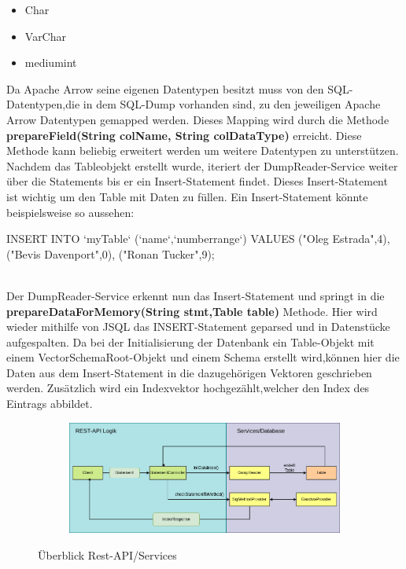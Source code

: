 \begin{itemize}
 \item Char
 \item VarChar
 \item mediumint
\end{itemize}

Da Apache Arrow seine eigenen Datentypen besitzt muss von den SQL-Datentypen,die in dem SQL-Dump vorhanden sind, zu den jeweiligen Apache Arrow Datentypen gemapped werden. 
Dieses Mapping wird durch die Methode \textbf{prepareField(String colName, String colDataType)} erreicht.
Diese Methode kann beliebig erweitert werden um weitere Datentypen zu unterstützen.\\
Nachdem das Tableobjekt erstellt wurde, iteriert der DumpReader-Service weiter über die Statements bis er ein Insert-Statement findet. Dieses Insert-Statement ist wichtig um den Table mit Daten zu füllen.
Ein Insert-Statement könnte beispielsweise so aussehen:\\

\begin{terminalblock}
  \begin{textcode}
INSERT INTO `myTable` (`name`,`numberrange`)
VALUES
  ("Oleg Estrada",4),
  ("Bevis Davenport",0),
  ("Ronan Tucker",9);
  \end{textcode}
\end{terminalblock}\\

Der DumpReader-Service erkennt nun das Insert-Statement und springt in die \textbf{prepareDataForMemory(String stmt,Table table)} Methode. Hier wird wieder mithilfe von JSQL das INSERT-Statement geparsed und in Datenstücke aufgespalten.
Da bei der Initialisierung der Datenbank ein Table-Objekt mit einem VectorSchemaRoot-Objekt und einem Schema erstellt wird,können hier die Daten aus dem Insert-Statement in die dazugehörigen Vektoren geschrieben werden.
Zusätzlich wird ein Indexvektor hochgezählt,welcher den Index des Eintrags abbildet.


\begin{figure}[h]
  \centering
  \begin{subfigure}[b]{1.0\textwidth}
    \includegraphics[width=1.0\linewidth]{img/logic}
  \end{subfigure}
  \caption{Überblick Rest-API/Services}
  \label{graf_3}
\end{figure}






